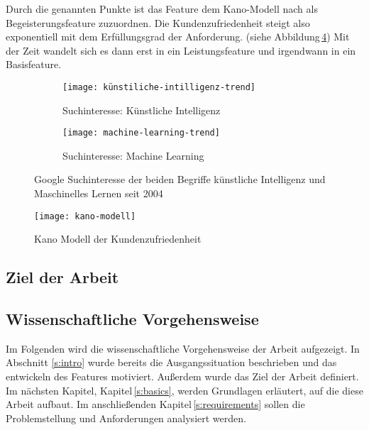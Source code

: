 Durch die genannten Punkte ist das Feature dem Kano-Modell nach als Begeisterungsfeature zuzuordnen. Die Kundenzufriedenheit steigt also exponentiell mit dem Erfüllungsgrad der Anforderung. (siehe Abbildung\,\ref{fig:kano-model}) Mit der Zeit wandelt sich es dann erst in ein Leistungsfeature und irgendwann in ein Basisfeature. \citep[p.~3-4]{Hölzing_2008}

\begin{figure}[h]
	\centering
	
	\begin{subfigure}{0.99\textwidth}
		\centering
	\texttt{[image: künstiliche-intilligenz-trend]}
		\caption{Suchinteresse: Künstliche Intelligenz}
		\label{FIG:ki-trend}
	\end{subfigure}
	\hspace{1cm}
	\begin{subfigure}{0.99\textwidth}
		\centering
	\texttt{[image: machine-learning-trend]}
		\caption{Suchinteresse: Machine Learning}
		\label{FIG:ml-trend}
	\end{subfigure}
	
	\caption[Google Trends]{Google Suchinteresse der beiden Begriffe \glqq künstliche Intelligenz\grqq{} und \glqq Maschinelles Lernen{} seit 2004}
	\label{fig:ki-ml-trend}
\end{figure}

\begin{figure}[h]
	\centering
	\texttt{[image: kano-modell]}
	\caption[Kano Modells]{Kano Modell der Kundenzufriedenheit}
	\label{fig:kano-model}
\end{figure}

\subsection{Ziel der Arbeit}
\label{c:intro:target}



\subsection{Wissenschaftliche Vorgehensweise}
\label{c:intro:methodology:scientific_proceture}
Im Folgenden wird die wissenschaftliche Vorgehensweise der Arbeit aufgezeigt.
In Abschnitt \ref{s:intro} wurde bereits die Ausgangssituation beschrieben und das entwickeln des Features motiviert. Außerdem wurde das Ziel der Arbeit definiert. Im nächsten Kapitel, Kapitel\,\ref{s:basics}, werden Grundlagen erläutert, auf die diese Arbeit aufbaut. Im anschließenden Kapitel\,\ref{s:requirements} sollen die Problemstellung und Anforderungen analysiert werden. %

